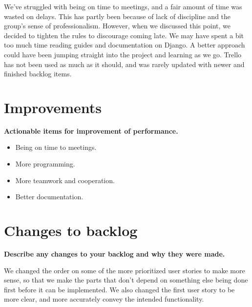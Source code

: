 \documentclass[12pt, a4paper]{article}
\begin{document}
We've struggled with being on time to meetings, and a fair amount of time was wasted on delays. This has partly been because of lack of discipline and the group's sense of professionalism. However, when we discussed this point, we decided to tighten the rules to discourage coming late.
We may have spent a bit too much time reading guides and documentation on Django. A better approach could have been jumping straight into the project and learning as we go.
Trello has not been used as much as it should, and was rarely updated with newer and finished backlog items.


\section{Improvements}
\textbf{Actionable items for improvement of performance.}

\begin{itemize}
    \item Being on time to meetings.
    \item More programming.
    \item More teamwork and cooperation.
    \item Better documentation.
\end{itemize}

\newpage
\section{Changes to backlog}
\textbf{Describe any changes to your backlog and why they were made.}

We changed the order on some of the more prioritized user stories to make more sense, so that we make the parts that don't depend on something else being done first before it can be implemented. We also changed the first user story to be more clear, and more accurately convey the intended functionality. 
\end{document}
